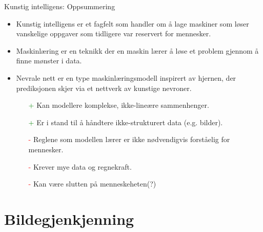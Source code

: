 \documentclass[8pt]{beamer}
\begin{document}
	\begin{frame}{Kunstig intelligens: Oppsummering}
		\centering
		\vfill
		\begin{itemize}
			\item Kunstig intelligens er et fagfelt som handler om å lage maskiner som løser vanskelige oppgaver som tidligere var reservert for mennesker.
			\item Maskinlæring er en teknikk der en maskin lærer å løse et problem gjennom å finne mønster i data.
			\item Nevrale nett er en type maskinlæringsmodell inspirert av hjernen, der prediksjonen skjer via et nettverk av kunstige nevroner.
			\begin{itemize}
				\item[\textcolor{green}{+}] Kan modellere komplekse, ikke-lineære sammenhenger.
				\item[\textcolor{green}{+}] Er i stand til å håndtere ikke-strukturert data (e.g. bilder).
				\item[\textcolor{red}{-}] Reglene som modellen lærer er ikke nødvendigvis forståelig for mennesker.
				\item[\textcolor{red}{-}] Krever mye data og regnekraft.
				\item[\textcolor{red}{-}] Kan være slutten på menneskeheten(?)
			\end{itemize}
		\end{itemize}
		\vfill
	\end{frame}

	\section{Bildegjenkjenning}
\end{document}
